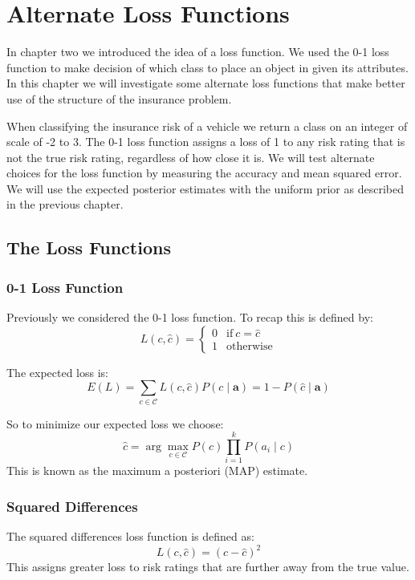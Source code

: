 \chapter{Alternate Loss Functions}

In chapter two we introduced the idea of a loss function.
We used the 0-1 loss function to make decision of which class to place an object in given its attributes.
In this chapter we will investigate some alternate loss functions that make better use of the structure of the insurance problem.

When classifying the insurance risk of a vehicle we return a class on an integer of scale of -2 to 3.
The 0-1 loss function assigns a loss of 1 to any risk rating that is not the true risk rating, regardless of how close it is.
We will test alternate choices for the loss function by measuring the accuracy and mean squared error.
We will use the expected posterior estimates with the uniform prior as described in the previous chapter.

\section{The Loss Functions}
\subsection{0-1 Loss Function}
Previously we considered the 0-1 loss function.
To recap this is defined by:
\begin{equation}
	L(c, \hat{c}) = 
	\begin{cases}
		0 & \text{if}\ c = \hat{c} \\
		1 & \text{otherwise}
	\end{cases}
\end{equation}

The expected loss is:
\begin{equation}
	E(L) = \sum_{c \in \mathcal{C}} L(c, \hat{c})P(c \mid \mathbf{a}) = 1 - P(\hat{c} \mid \mathbf{a})
\end{equation}

So to minimize our expected loss we choose:
\begin{equation}\label{map}
	\hat c = \arg\max_{c \in \mathcal{C}} P(c)\prod_{i=1}^{k}P(a_i \mid c)
\end{equation}
This is known as the maximum a posteriori (MAP) estimate.

\subsection{Squared Differences}
The squared differences loss function is defined as:
\begin{equation}
	L(c, \hat{c}) = (c - \hat{c})^2
\end{equation}
This assigns greater loss to risk ratings that are further away from the true value.

